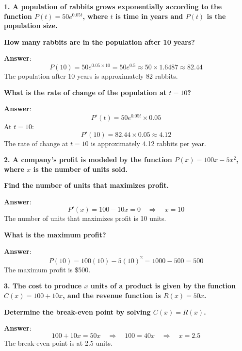 \documentclass{article}
\begin{document}
\textbf{1. A population of rabbits grows exponentially according to the function \( P(t) = 50e^{0.05t} \), where \( t \) is time in years and \( P(t) \) is the population size.}

\textbf{How many rabbits are in the population after 10 years?}

\textbf{Answer}: 
\[
P(10) = 50e^{0.05 \times 10} = 50e^{0.5} \approx 50 \times 1.6487 \approx 82.44
\]
The population after 10 years is approximately 82 rabbits.

\bigskip

\textbf{What is the rate of change of the population at \( t = 10 \)?}

\textbf{Answer}: 
\[
P'(t) = 50e^{0.05t} \times 0.05
\]
At \( t = 10 \):
\[
P'(10) = 82.44 \times 0.05 \approx 4.12
\]
The rate of change at \( t = 10 \) is approximately 4.12 rabbits per year.

\bigskip

\textbf{2. A company’s profit is modeled by the function \( P(x) = 100x - 5x^2 \), where \( x \) is the number of units sold.}

\textbf{Find the number of units that maximizes profit.}

\textbf{Answer}: 
\[
P'(x) = 100 - 10x = 0 \quad \Rightarrow \quad x = 10
\]
The number of units that maximizes profit is 10 units.

\bigskip

\textbf{What is the maximum profit?}

\textbf{Answer}: 
\[
P(10) = 100(10) - 5(10)^2 = 1000 - 500 = 500
\]
The maximum profit is \$500.

\bigskip

\textbf{3. The cost to produce \( x \) units of a product is given by the function \( C(x) = 100 + 10x \), and the revenue function is \( R(x) = 50x \).}

\textbf{Determine the break-even point by solving \( C(x) = R(x) \).}

\textbf{Answer}: 
\[
100 + 10x = 50x \quad \Rightarrow \quad 100 = 40x \quad \Rightarrow \quad x = 2.5
\]
The break-even point is at 2.5 units.
\end{document}

